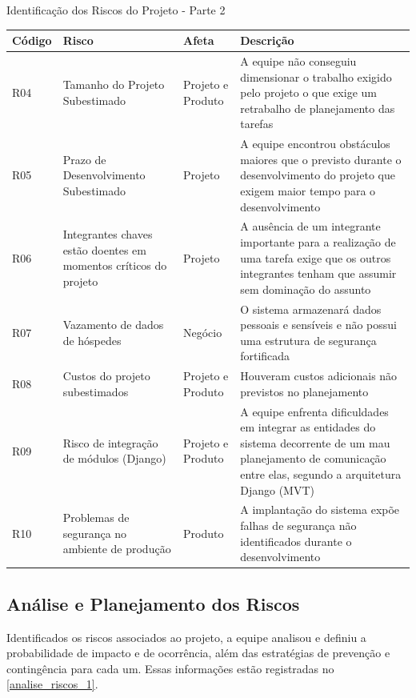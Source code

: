\documentclass[
	12pt,				%
	openany,			%
	twoside,			%
	a4paper,			%
	english,			%
	french,				%
	spanish,			%
	brazil				%
	]{abntex2}
\begin{document}
			
\begin{quadro} [H]
	\caption{Identificação dos Riscos do Projeto - Parte 2} \label{identificacao_riscos_2} 
	\begin{tabular}{|p{2.8cm}|p{5cm}|p{3cm}|p{4.2cm}|}
		\hline
		\textbf{Código} & \textbf{Risco} & \textbf{Afeta} & \textbf{Descrição}  \\
		\hline			
			R04 & Tamanho do Projeto Subestimado &
			Projeto e Produto  & A equipe não conseguiu dimensionar o trabalho exigido pelo projeto o que exige um retrabalho de planejamento das tarefas \\
		\hline
			R05 & Prazo de Desenvolvimento Subestimado &
			Projeto & A equipe encontrou obstáculos maiores que o previsto durante o desenvolvimento do projeto que exigem maior tempo para o desenvolvimento \\
		\hline
			R06 & 	Integrantes chaves estão doentes em momentos críticos do projeto & Projeto & A ausência de um integrante importante para a realização de uma tarefa exige que os outros integrantes tenham que assumir sem dominação do assunto \\
		\hline
			R07 & Vazamento de dados de hóspedes & Negócio & O sistema  armazenará dados pessoais e sensíveis e não possui uma estrutura de segurança fortificada \\
		\hline
			R08 & Custos do projeto subestimados & Projeto e Produto & Houveram custos adicionais não previstos no planejamento \\
		\hline
		R09 & Risco de integração de módulos (Django) & Projeto e Produto & A equipe enfrenta dificuldades em integrar as entidades do sistema decorrente de um mau planejamento de comunicação entre elas, segundo a arquitetura Django (MVT) \\
		\hline
		R10 & Problemas de segurança no ambiente de produção & Produto & A implantação do sistema expõe falhas de segurança não identificados durante o desenvolvimento \\
		\hline
\end{tabular}
\end{quadro}			
\subsection{Análise e Planejamento dos Riscos}
Identificados os riscos associados ao projeto, a equipe analisou e definiu a probabilidade de impacto e de ocorrência, além das estratégias de prevenção e contingência para cada um. Essas informações estão registradas no \autoref{analise_riscos_1}.
 
\end{document}
